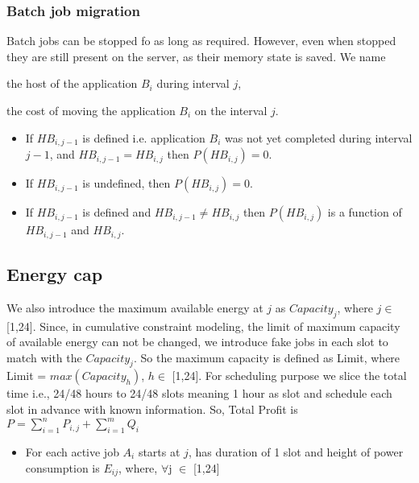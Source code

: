 \documentclass[a4paper]{article}
\begin{document}
\subsubsection{Batch job migration}

Batch jobs can be stopped fo as long as required. However, even when stopped they are still present on the server, as their memory state is saved. We name

\begin{description}[labelwidth=4em,align=left,labelindent=2em]
	\item [$HB_{i,j}$] the host of the application $B_i$ during interval $j$,
	\item [$PHB_{i,j}$] the cost of moving the application $B_i$ on the interval $j$.
		\begin{itemize}
			\item If $HB_{i,j-1}$ is defined i.e. application $B_i$ was not yet completed during interval $j-1$, and $HB_{i,j-1} = HB_{i,j}$ then $P(HB_{i,j}) = 0$.
			\item If $HB_{i,j-1}$ is undefined, then $P(HB_{i,j}) = 0$.
			\item If $HB_{i,j-1}$ is defined and $HB_{i,j-1} \neq HB_{i,j}$ then $P(HB_{i,j})$ is a function of $HB_{i,j-1}$ and $HB_{i,j}$.
		\end{itemize}
\end{description}


\subsection{Energy cap}

We also introduce the maximum available energy at $j$ as $Capacity_j$, where $j\in$ [1,24]. Since, in cumulative constraint modeling, the limit of maximum capacity of available energy can not be changed, we introduce fake jobs in each slot to match with the $Capacity_j$. So the maximum capacity is defined as Limit, where Limit = $max (Capacity_{h})$, ${h}\in$ [1,24]. For scheduling purpose we slice the total time i.e., 24/48 hours to 24/48 slots meaning 1 hour as slot and schedule each slot in advance with known information. So, Total Profit is $P=\sum_{i=1}^{n} {P_{i,j}} + \sum_{i=1}^{m} {Q_i}$
 
\begin{itemize}
\item For each active job $A_{i}$ starts at $j$, has duration of 1 slot and height of power consumption is $E_{ij}$, where, $\forall$j $\in$ [1,24]
\end{itemize}
\end{document}
